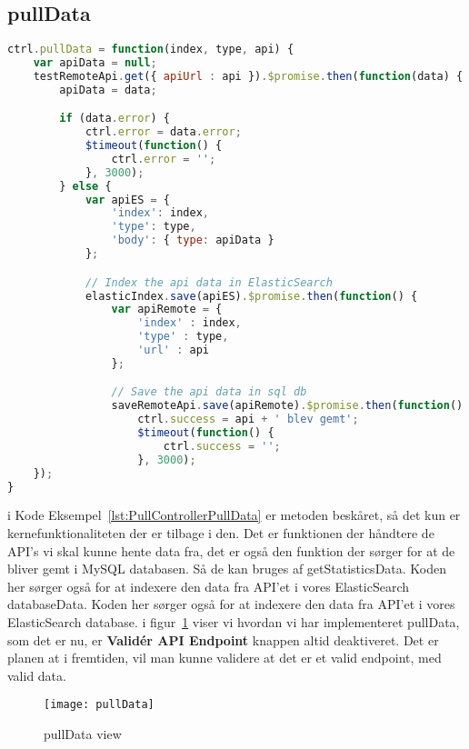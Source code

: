 \subsection{pullData}
\begin{lstlisting}[caption={pullData}, language={JavaScript}, label={lst:PullControllerPullData}]
ctrl.pullData = function(index, type, api) {
    var apiData = null;
    testRemoteApi.get({ apiUrl : api }).$promise.then(function(data) {
        apiData = data;

        if (data.error) {
            ctrl.error = data.error;
            $timeout(function() {
                ctrl.error = '';
            }, 3000);
        } else {
            var apiES = {
                'index': index,
                'type': type,
                'body': { type: apiData }
            };

            // Index the api data in ElasticSearch
            elasticIndex.save(apiES).$promise.then(function() {
                var apiRemote = {
                    'index' : index,
                    'type' : type,
                    'url' : api
                };

                // Save the api data in sql db
                saveRemoteApi.save(apiRemote).$promise.then(function() {
                    ctrl.success = api + ' blev gemt';
                    $timeout(function() {
                        ctrl.success = '';
                    }, 3000);
    });
}
\end{lstlisting}
i Kode Eksempel~\ref{lst:PullControllerPullData} er metoden beskåret, så det kun er kernefunktionaliteten der er tilbage i den.
Det er funktionen der håndtere de API's vi skal kunne hente data fra, det er også den funktion der sørger for at de bliver gemt 
i MySQL databasen. Så de kan bruges af getStatisticsData. Koden her sørger også for at indexere den data fra API'et i vores ElasticSearch
databaseData. Koden her sørger også for at indexere den data fra API'et i vores ElasticSearch
database. i figur~\ref{fig:pullData} viser vi hvordan vi har implementeret pullData, som det er nu, er \textbf{Validér API Endpoint} knappen altid deaktiveret. 
Det er planen at i fremtiden, vil man kunne validere at det er et valid endpoint, med valid data.
\begin{figure}[H]
     \centering
     \texttt{[image: pullData]}
     \caption{pullData view}
     \label{fig:pullData}
\end{figure}
